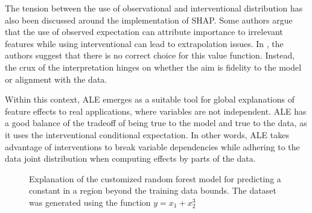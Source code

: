 The tension between the use of observational and interventional distribution has also been discussed around the implementation of SHAP. Some authors argue that the use of observed expectation can attribute importance to irrelevant features \cite{Janzing2020FeatureProblem, Sundararajan2020TheExplanation} while using interventional can lead to extrapolation issues. In \cite{Chen2020TrueData}, the authors suggest that there is no correct choice for this value function. Instead, the crux of the interpretation hinges on whether the aim is fidelity to the model or alignment with the data.

Within this context, ALE emerges as a suitable tool for global explanations of feature effects to real applications, where variables are not independent. ALE has a good balance of the tradeoff of being true to the model and true to the data, as it uses the interventional conditional expectation. In other words, ALE takes advantage of interventions to break variable dependencies while adhering to the data joint distribution when computing effects by parts of the data.

\begin{figure}[ht!]
\centering
  \caption{Explanation of the customized random forest model for predicting a constant in a region beyond the training data bounds. The dataset was generated using the function $y = x_1 + x_2^3$}
    \label{fig:extrapolation_rf}
\end{figure}

